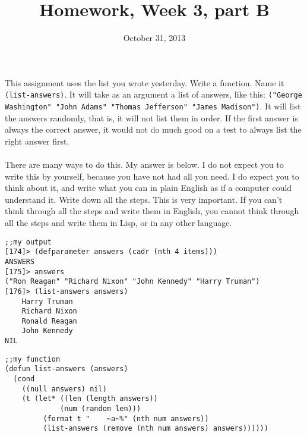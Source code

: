 \documentclass{article}
\title{Homework, Week 3, part B}
\date{October 31, 2013}
\begin{document}
\maketitle{}

\paragraph{}This assignment uses the list you wrote yesterday. Write a function. Name it \texttt{(list-answers)}. It will take as an argument a list of answers, like this: \texttt{("George Washington" "John Adams" "Thomas Jefferson" "James Madison")}. It will list the answers randomly, that is, it will not list them in order. If the first answer is always the correct answer, it would not do much good on a test to always list the right answer first.

\paragraph{}There are many ways to do this. My answer is below. I do not expect you to write this by yourself, because you have not had all you need. I do expect you to think about it, and write what you can in plain English as if a computer could understand it. Write down all the steps. This is very important. If you can't think through all the steps and write them in English, you cannot think through all the steps and write them in Lisp, or in any other language.

\lstset{language=Lisp,numbers=left,keepspaces=false,basicstyle=\small,numberstyle=\tiny,breaklines=true,showstringspaces=false}
\begin{lstlisting}
;;my output
[174]> (defparameter answers (cadr (nth 4 items)))
ANSWERS
[175]> answers
("Ron Reagan" "Richard Nixon" "John Kennedy" "Harry Truman")
[176]> (list-answers answers)
    Harry Truman
    Richard Nixon
    Ronald Reagan
    John Kennedy
NIL
\end{lstlisting}

\lstset{language=Lisp,numbers=left,keepspaces=false,basicstyle=\small,numberstyle=\tiny,breaklines=true,showstringspaces=false}
\begin{lstlisting}
;;my function
(defun list-answers (answers)
  (cond
    ((null answers) nil)
    (t (let* ((len (length answers))
             (num (random len)))
         (format t "    ~a~%" (nth num answers))
         (list-answers (remove (nth num answers) answers))))))
\end{lstlisting}
\end{document}
